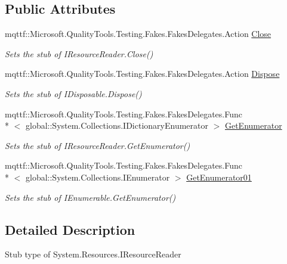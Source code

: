 \subsection*{Public Attributes}
\begin{DoxyCompactItemize}
\item 
mqttf\-::\-Microsoft.\-Quality\-Tools.\-Testing.\-Fakes.\-Fakes\-Delegates.\-Action \hyperlink{class_system_1_1_resources_1_1_fakes_1_1_stub_i_resource_reader_aa5e78ffe1d986120008fe525930a4cbf}{Close}
\begin{DoxyCompactList}\small\item\em Sets the stub of I\-Resource\-Reader.\-Close()\end{DoxyCompactList}\item 
mqttf\-::\-Microsoft.\-Quality\-Tools.\-Testing.\-Fakes.\-Fakes\-Delegates.\-Action \hyperlink{class_system_1_1_resources_1_1_fakes_1_1_stub_i_resource_reader_a2c0fa269110c7d3e7a8ec5d3c3e16066}{Dispose}
\begin{DoxyCompactList}\small\item\em Sets the stub of I\-Disposable.\-Dispose()\end{DoxyCompactList}\item 
mqttf\-::\-Microsoft.\-Quality\-Tools.\-Testing.\-Fakes.\-Fakes\-Delegates.\-Func\\*
$<$ global\-::\-System.\-Collections.\-I\-Dictionary\-Enumerator $>$ \hyperlink{class_system_1_1_resources_1_1_fakes_1_1_stub_i_resource_reader_a323aaeb94e424263a5122a6034e01da1}{Get\-Enumerator}
\begin{DoxyCompactList}\small\item\em Sets the stub of I\-Resource\-Reader.\-Get\-Enumerator()\end{DoxyCompactList}\item 
mqttf\-::\-Microsoft.\-Quality\-Tools.\-Testing.\-Fakes.\-Fakes\-Delegates.\-Func\\*
$<$ global\-::\-System.\-Collections.\-I\-Enumerator $>$ \hyperlink{class_system_1_1_resources_1_1_fakes_1_1_stub_i_resource_reader_a0d2a1dcf008eb8b4f0875bf82da68908}{Get\-Enumerator01}
\begin{DoxyCompactList}\small\item\em Sets the stub of I\-Enumerable.\-Get\-Enumerator()\end{DoxyCompactList}\end{DoxyCompactItemize}


\subsection{Detailed Description}
Stub type of System.\-Resources.\-I\-Resource\-Reader



